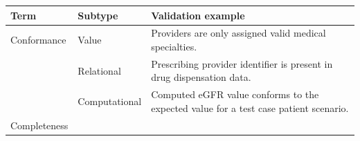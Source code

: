 \documentclass[]{book}
\begin{document}
\begin{longtable}[]{@{}lll@{}}
\toprule
\begin{minipage}[b]{0.09\columnwidth}\raggedright\strut
Term\strut
\end{minipage} & \begin{minipage}[b]{0.16\columnwidth}\raggedright\strut
Subtype\strut
\end{minipage} & \begin{minipage}[b]{0.67\columnwidth}\raggedright\strut
Validation example\strut
\end{minipage}\tabularnewline
\midrule
\endhead
\begin{minipage}[t]{0.09\columnwidth}\raggedright\strut
Conformance\strut
\end{minipage} & \begin{minipage}[t]{0.16\columnwidth}\raggedright\strut
Value\strut
\end{minipage} & \begin{minipage}[t]{0.67\columnwidth}\raggedright\strut
Providers are only assigned valid medical specialties.\strut
\end{minipage}\tabularnewline
\begin{minipage}[t]{0.09\columnwidth}\raggedright\strut
\strut
\end{minipage} & \begin{minipage}[t]{0.16\columnwidth}\raggedright\strut
Relational\strut
\end{minipage} & \begin{minipage}[t]{0.67\columnwidth}\raggedright\strut
Prescribing provider identifier is present in drug dispensation
data.\strut
\end{minipage}\tabularnewline
\begin{minipage}[t]{0.09\columnwidth}\raggedright\strut
\strut
\end{minipage} & \begin{minipage}[t]{0.16\columnwidth}\raggedright\strut
Computational\strut
\end{minipage} & \begin{minipage}[t]{0.67\columnwidth}\raggedright\strut
Computed eGFR value conforms to the expected value for a test case
patient scenario.\strut
\end{minipage}\tabularnewline
\begin{minipage}[t]{0.09\columnwidth}\raggedright\strut
Completeness\strut
\end{minipage} & \begin{minipage}[t]{0.16\columnwidth}\raggedright\strut

\end{minipage}
\end{longtable}
\end{document}
